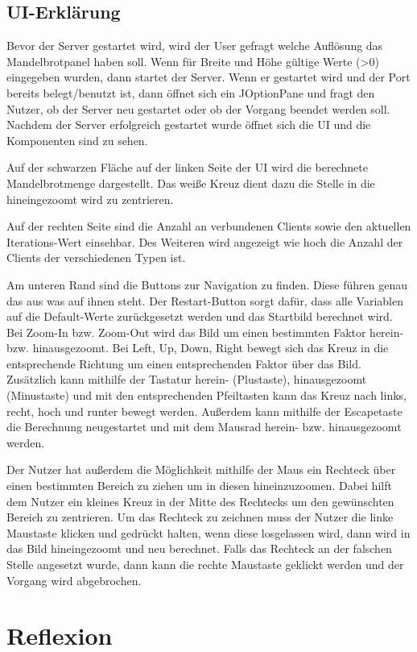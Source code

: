 \documentclass[12pt, onecolumn,notitlepage]{scrartcl}
\begin{document}
\subsection{UI-Erklärung}
Bevor der Server gestartet wird, wird der User gefragt welche Auflösung das Mandelbrotpanel haben soll. Wenn für Breite und Höhe gültige Werte (>0) eingegeben wurden, dann startet der Server. Wenn er gestartet wird und der Port bereits belegt/benutzt ist, dann öffnet sich ein JOptionPane und fragt den Nutzer, ob der Server neu gestartet oder ob der Vorgang beendet werden soll. Nachdem der Server erfolgreich gestartet wurde öffnet sich die UI und die Komponenten sind zu sehen. \par
Auf der schwarzen Fläche auf der linken Seite der UI wird die berechnete Mandelbrotmenge dargestellt. Das weiße Kreuz dient dazu die Stelle in die hineingezoomt wird zu zentrieren. \par
Auf der rechten Seite sind die Anzahl an verbundenen Clients sowie den aktuellen Iterations-Wert einsehbar. Des Weiteren wird angezeigt wie hoch die Anzahl der Clients der verschiedenen Typen ist. \par
Am unteren Rand sind die Buttons zur Navigation zu finden. Diese führen genau das aus was auf ihnen steht. Der Restart-Button sorgt dafür, dass alle Variablen auf die Default-Werte zurückgesetzt werden und das Startbild berechnet wird. Bei Zoom-In bzw. Zoom-Out wird das Bild um einen bestimmten Faktor herein- bzw. hinausgezoomt. Bei Left, Up, Down, Right bewegt sich das Kreuz in die entsprechende Richtung um einen entsprechenden Faktor über das Bild. Zusätzlich kann mithilfe der Tastatur herein- (Plustaste), hinausgezoomt (Minustaste) und mit den entsprechenden Pfeiltasten kann das Kreuz nach links, recht, hoch und runter bewegt werden. Außerdem kann mithilfe der Escapetaste die Berechnung neugestartet und mit dem Mausrad herein- bzw. hinausgezoomt werden. \par
Der Nutzer hat außerdem die Möglichkeit mithilfe der Maus ein Rechteck über einen bestimmten Bereich zu ziehen um in diesen hineinzuzoomen. Dabei hilft dem Nutzer ein kleines Kreuz in der Mitte des Rechtecks um den gewünschten Bereich zu zentrieren. Um das Rechteck zu zeichnen  muss der Nutzer die linke Maustaste klicken und gedrückt halten, wenn diese losgelassen wird, dann wird in das Bild hineingezoomt und neu berechnet. Falls das Rechteck an der falschen Stelle angesetzt wurde, dann kann die rechte Maustaste geklickt werden und der Vorgang wird abgebrochen.


\section{Reflexion}


\nocite{*}
\end{document}

